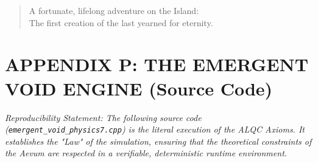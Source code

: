 \documentclass[11pt, letterpaper]{article}
\begin{document}
\begin{verse}
A fortunate, lifelong adventure on the Island:\\
The first creation of the last yearned for eternity.
\end{verse}

\newpage
\section{APPENDIX P: THE EMERGENT VOID ENGINE (Source Code)}
\label{app:emergent_void}

\textit{Reproducibility Statement: The following source code (\texttt{emergent\_void\_physics7.cpp}) is the literal execution of the ALQC Axioms. It establishes the "Law" of the simulation, ensuring that the theoretical constraints of the Aevum are respected in a verifiable, deterministic runtime environment.}
\end{document}
